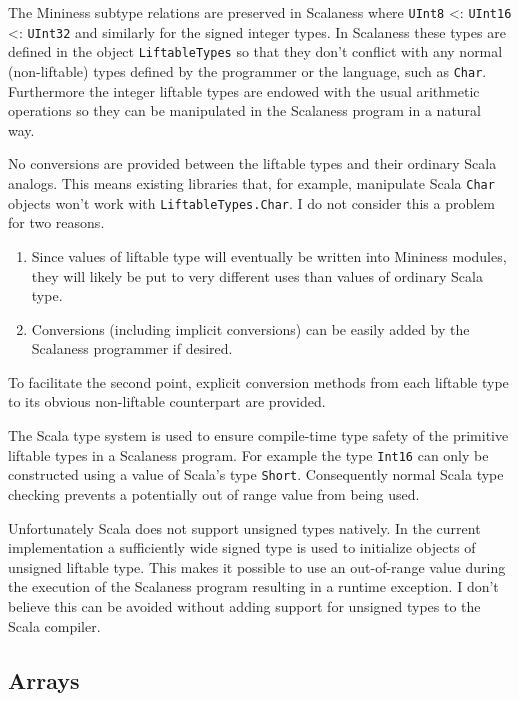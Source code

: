 The Mininess subtype relations are preserved in Scalaness where \texttt{UInt8} <:
\texttt{UInt16} <: \texttt{UInt32} and similarly for the signed integer types. In Scalaness
these types are defined in the object \texttt{LiftableTypes} so that they don't conflict with
any normal (non-liftable) types defined by the programmer or the language, such as
\texttt{Char}. Furthermore the integer liftable types are endowed with the usual arithmetic
operations so they can be manipulated in the Scalaness program in a natural way.

No conversions are provided between the liftable types and their ordinary Scala analogs. This
means existing libraries that, for example, manipulate Scala \texttt{Char} objects won't work
with \texttt{LiftableTypes.Char}. I do not consider this a problem for two reasons.
\begin{enumerate}
\item Since values of liftable type will eventually be written into Mininess modules, they will
  likely be put to very different uses than values of ordinary Scala type.
\item Conversions (including implicit conversions) can be easily added by the Scalaness
  programmer if desired.
\end{enumerate}

To facilitate the second point, explicit conversion methods from each liftable type to its
obvious non-liftable counterpart are provided.


The Scala type system is used to ensure compile-time type safety of the primitive liftable types
in a Scalaness program. For example the type \texttt{Int16} can only be constructed using a
value of Scala's type \texttt{Short}. Consequently normal Scala type checking prevents a
potentially out of range value from being used.

Unfortunately Scala does not support unsigned types natively. In the current implementation a
sufficiently wide signed type is used to initialize objects of unsigned liftable type. This
makes it possible to use an out-of-range value during the execution of the Scalaness program
resulting in a runtime exception. I don't believe this can be avoided without adding support for
unsigned types to the Scala compiler.

\subsection{Arrays}

